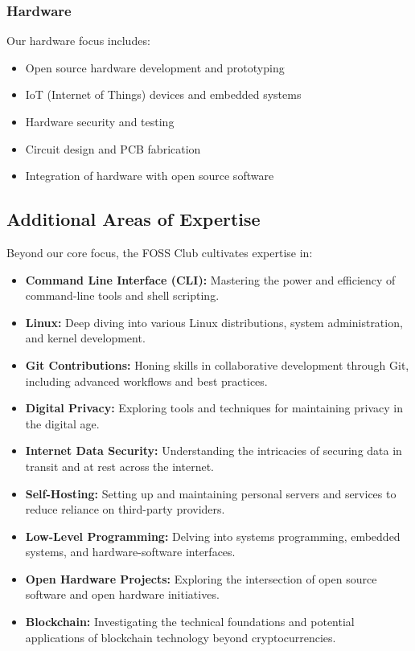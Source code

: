 \documentclass[12pt,a4paper]{article}
\begin{document}
\subsubsection{Hardware}
Our hardware focus includes:
\begin{itemize}
    \item Open source hardware development and prototyping
    \item IoT (Internet of Things) devices and embedded systems
    \item Hardware security and testing
    \item Circuit design and PCB fabrication
    \item Integration of hardware with open source software
\end{itemize}

\subsection{Additional Areas of Expertise}

Beyond our core focus, the FOSS Club cultivates expertise in:

\begin{itemize}
    \item \textbf{Command Line Interface (CLI):} Mastering the power and efficiency of command-line tools and shell scripting.
    
    \item \textbf{Linux:} Deep diving into various Linux distributions, system administration, and kernel development.
    
    \item \textbf{Git Contributions:} Honing skills in collaborative development through Git, including advanced workflows and best practices.
    
    \item \textbf{Digital Privacy:} Exploring tools and techniques for maintaining privacy in the digital age.
    
    \item \textbf{Internet Data Security:} Understanding the intricacies of securing data in transit and at rest across the internet.
    
    \item \textbf{Self-Hosting:} Setting up and maintaining personal servers and services to reduce reliance on third-party providers.
    
    \item \textbf{Low-Level Programming:} Delving into systems programming, embedded systems, and hardware-software interfaces.
    
    \item \textbf{Open Hardware Projects:} Exploring the intersection of open source software and open hardware initiatives.
    
    \item \textbf{Blockchain:} Investigating the technical foundations and potential applications of blockchain technology beyond cryptocurrencies.
\end{itemize}
\end{document}
